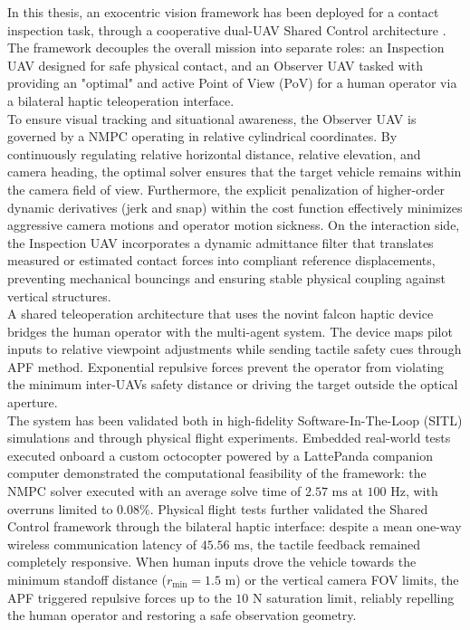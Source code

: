 In this thesis, an exocentric vision framework has been deployed for a contact inspection task, through a cooperative dual-UAV Shared Control architecture . The framework decouples the overall mission into separate roles: an Inspection UAV designed for safe physical contact, and an Observer UAV tasked with providing an "optimal" and active Point of View (PoV) for a human operator via a bilateral haptic teleoperation interface.
\\To ensure visual tracking and situational awareness, the Observer UAV is governed by a NMPC operating in relative cylindrical coordinates. By continuously regulating relative horizontal distance, relative elevation, and camera heading, the optimal solver ensures that the target vehicle remains within the camera field of view. Furthermore, the explicit penalization of higher-order dynamic derivatives (jerk and snap) within the cost function effectively minimizes aggressive camera motions and operator motion sickness. On the interaction side, the Inspection UAV incorporates a dynamic admittance filter that translates measured or estimated contact forces into compliant reference displacements, preventing mechanical bouncings and ensuring stable physical coupling against vertical structures.
\\A shared teleoperation architecture that uses the novint falcon haptic device bridges the human operator with the multi-agent system. The device maps pilot inputs to relative viewpoint adjustments while sending tactile safety cues through APF method. Exponential repulsive forces prevent the operator from violating the minimum inter-UAVs safety distance or driving the target outside the optical aperture.
\\The system has been validated both in high-fidelity Software-In-The-Loop (SITL) simulations and through physical flight experiments. Embedded real-world tests executed onboard a custom octocopter powered by a LattePanda companion computer demonstrated the computational feasibility of the framework: the NMPC solver executed with an average solve time of $2.57\text{ ms}$ at $100\text{ Hz}$, with overruns limited to $0.08\%$. Physical flight tests further validated the Shared Control framework through the bilateral haptic interface: despite a mean one-way wireless communication latency of $45.56\text{ ms}$, the tactile feedback remained completely responsive. When human inputs drove the vehicle towards the minimum standoff distance ($r_{\min} = 1.5\text{ m}$) or the vertical camera FOV limits, the APF triggered repulsive forces up to the $10\text{ N}$ saturation limit, reliably repelling the human operator and restoring a safe observation geometry.
